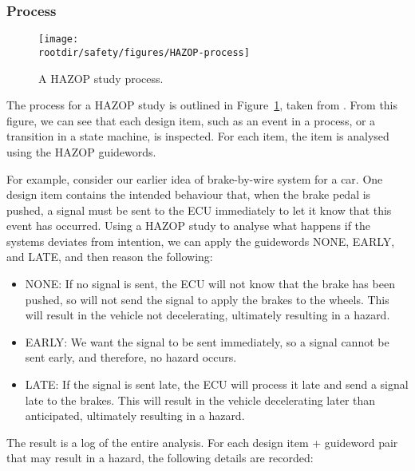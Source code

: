 \subsubsection*{Process}

\begin{figure}[!h]
\centering
\texttt{[image: \\rootdir/safety/figures/HAZOP-process]}
\caption{A HAZOP study process.}
\label{fig:safety:HAZOP-process}
\end{figure}


The process for a HAZOP study is outlined in Figure~\ref{fig:safety:HAZOP-process}, taken from \cite{mcdermid1995experience}. From this figure, we can see that each design item, such as an event in a process, or a transition in a state machine, is inspected. For each item, the item is analysed using the HAZOP guidewords. 

For example, consider our earlier idea of brake-by-wire system for a car. One design item contains the intended behaviour that, when the brake pedal is pushed, a signal must be sent to the ECU immediately to let it know that this event has occurred. Using a HAZOP study to analyse what happens if the systems deviates from intention, we can apply the guidewords NONE, EARLY, and LATE, and then reason the following:

\begin{itemize}
 
 \item NONE: If no signal is sent, the ECU will not know that the brake has been pushed, so will not send the signal to apply the brakes to the wheels. This will result in the vehicle not decelerating, ultimately resulting in a hazard.

 \item EARLY: We want the signal to be sent immediately, so a signal cannot be sent early, and therefore, no hazard occurs.

 \item LATE: If the signal is sent late, the ECU will process it late and send a signal late to the brakes. This will result in the vehicle decelerating later than anticipated, ultimately resulting in a hazard.

\end{itemize}


The result is a log of the entire analysis. For each design item + guideword pair that may result in a hazard, the following details are recorded:

